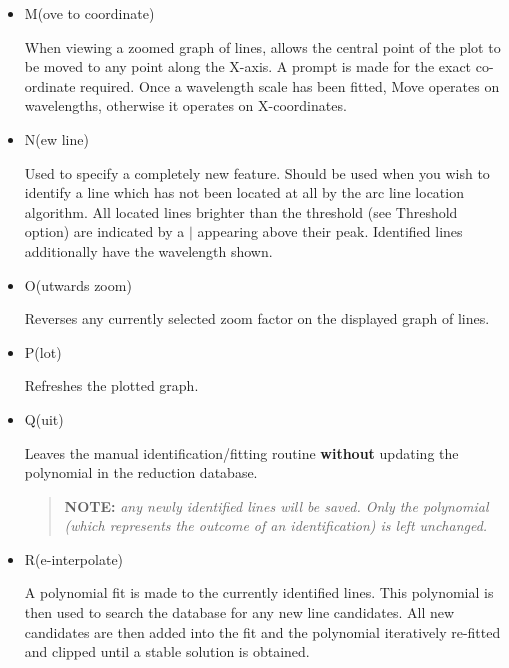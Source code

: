 \begin{itemize}
\begin{itemize}
      \item {\sunspec{\Large\tt}{\bf} M}(ove to coordinate)

            When viewing a zoomed graph
            of lines, allows the central point of the plot to be moved to
            any point along the X-axis. A prompt is made for the exact
            co-ordinate required. Once a wavelength scale has been fitted,
            Move operates on wavelengths, otherwise it operates on
            X-coordinates.

      \item {\sunspec{\Large\tt}{\bf} N}(ew line)

            Used to specify a completely new
            feature. Should be used when you wish to identify a line which
            has not been located at all by the arc line location algorithm.
            All located lines brighter than the threshold (see Threshold
            option) are indicated by a \(\mid\) appearing above their peak.
            Identified lines additionally have the wavelength shown.

      \item {\sunspec{\Large\tt}{\bf} O}(utwards zoom)

            Reverses any currently selected
            zoom factor on the displayed graph of lines.

      \item {\sunspec{\Large\tt}{\bf} P}(lot)

            Refreshes the plotted graph.

      \item {\sunspec{\Large\tt}{\bf} Q}(uit)

            Leaves the manual identification/fitting
            routine {\bf without} updating the polynomial in the reduction
            database.

            \begin{quote}

               {\bf NOTE:} {\sl any newly identified lines will be saved.
               Only the polynomial (which represents the outcome of an
               identification) is left unchanged.}

            \end{quote}

      \item {\sunspec{\Large\tt}{\bf} R}(e-interpolate)

            A polynomial fit is made to the
            currently identified lines. This polynomial is then used to
            search the database for any new line candidates. All new
            candidates are then added into the fit and the polynomial
            iteratively re-fitted and clipped until a stable solution is
            obtained.


\end{itemize}
\end{itemize}
